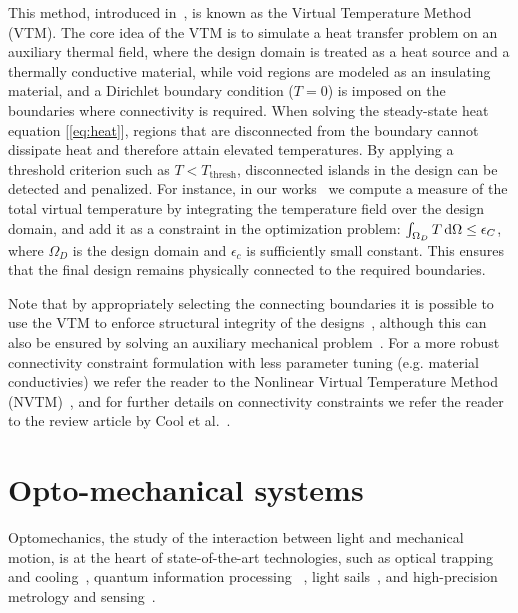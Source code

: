 This method, introduced in~\cite{li_structural_2016}, is known as the Virtual Temperature
Method (VTM). The core idea of the VTM is to simulate a heat transfer problem on an auxiliary thermal field, where the design 
domain is treated as a heat source and a thermally conductive material, while void regions are modeled as an
insulating material, and a Dirichlet boundary condition ($T = 0$) is imposed on the boundaries where connectivity is required. When 
solving the steady-state heat equation [\eqref{eq:heat}], regions that are disconnected from the boundary 
cannot dissipate heat and therefore attain elevated temperatures. By applying a threshold criterion such as $T < T_\text{thresh}$, disconnected islands in the design can be 
detected and penalized. For instance, in our works~\cite{ownpub1,ownpub2} we compute a measure of the total virtual temperature
by integrating the temperature field over the design domain, and add it as a constraint in the optimization problem:
$\int_{\Omega_D} T \mathop{}\!\text{d} \Omega \leq \epsilon_C$, where $\Omega_D$ is the design domain and $\epsilon_c$ is sufficiently small constant. This ensures that the final design remains physically connected to the required 
boundaries. 


Note that by appropriately selecting the connecting boundaries it is possible to use the VTM to enforce
structural integrity of the designs~\cite{structural_heat}, although this can also be ensured by solving an auxiliary
mechanical problem~\cite{structural_integrity}. For a more robust connectivity constraint formulation with less parameter tuning (e.g. material conductivies) we refer the reader to the Nonlinear 
Virtual Temperature Method (NVTM)~\cite{nvtm}, and for further details on connectivity constraints we refer the reader to the review 
article by Cool et al.~\cite{vanessa}.

\section{Opto-mechanical systems~\cite{ownpub1,ownpub2,ownpub3}}

Optomechanics, the study of the interaction between light and mechanical motion, is at the heart of state-of-the-art technologies, such as 
optical trapping~\cite{ashkin_acceleration_1970, moffitt_recent_2008} and cooling~\cite{cooling}, quantum information processing~\cite{Andrews_2014, Xi_2025}
, light sails~\cite{lightsail, lightsail1}, and high-precision metrology and sensing~\cite{sensing, weakforce, Li:18, Mason_2019}.

